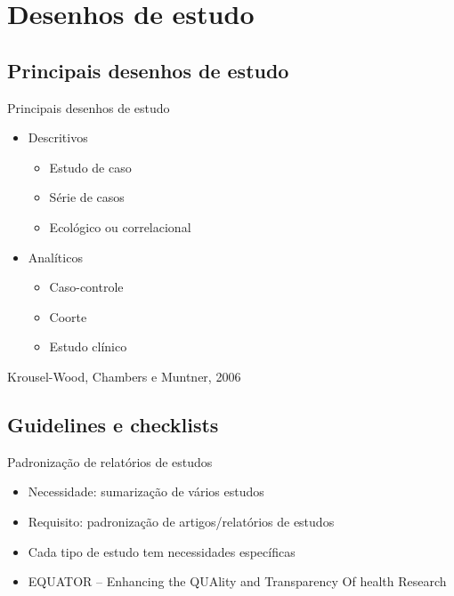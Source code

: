 \documentclass{beamer}
\begin{document}
\section{Desenhos de estudo}

\subsection{Principais desenhos de estudo}

\begin{frame}{Principais desenhos de estudo}
  \begin{itemize}
  \item Descritivos
    \begin{itemize}
    \item Estudo de caso
    \item Série de casos
    \item Ecológico ou correlacional
    \end{itemize}
  \item Analíticos
    \begin{itemize}
    \item Caso-controle
    \item Coorte
    \item Estudo clínico
    \end{itemize}
  \end{itemize}

  \vfill
  \tiny
  \hfill Krousel-Wood, Chambers e Muntner, 2006
\end{frame}

\subsection{Guidelines e checklists}

\begin{frame}{Padronização de relatórios de estudos}
  \begin{itemize}
    \small
  \item Necessidade: sumarização de vários estudos
  \bigskip
  \item Requisito: padronização de artigos/relatórios de estudos
    \bigskip
  \item Cada tipo de estudo tem necessidades específicas
    \bigskip
    \footnotesize
  \item EQUATOR -- {\scriptsize Enhancing the QUAlity and Transparency Of health Research}
  \end{itemize}
\end{frame}
\end{document}
